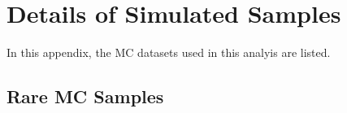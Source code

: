 \chapter{Details of Simulated Samples}
\label{ch:mc_details}

In this appendix, the MC datasets used in this analyis are listed.

\section{Rare MC Samples}
\label{sec:mc_details_rare}

